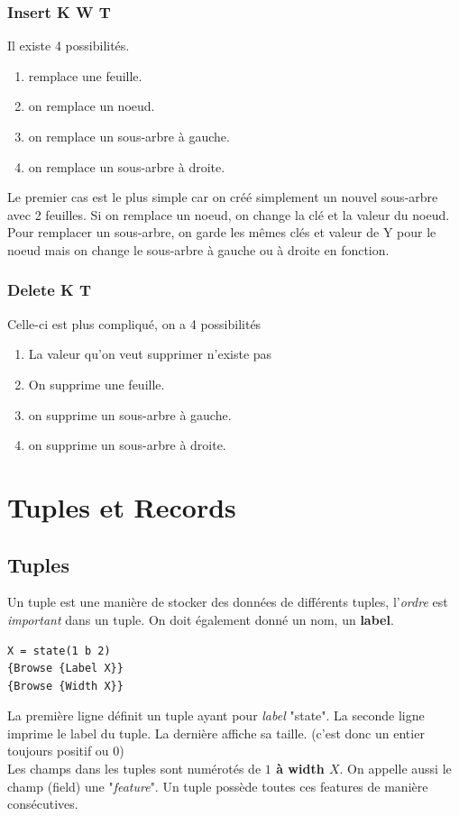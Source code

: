 \documentclass{report}
\begin{document}
\subsubsection{Insert K W T}
Il existe 4 possibilités.
\begin{enumerate}
\item remplace une feuille.
\item on remplace un noeud.
\item on remplace un sous-arbre à gauche.
\item on remplace un sous-arbre à droite.
\end{enumerate}
Le premier cas est le plus simple car on créé simplement un nouvel sous-arbre avec 2 feuilles. Si on remplace un noeud, on change la clé et la valeur du noeud.
Pour remplacer un sous-arbre, on garde les mêmes clés et valeur de Y pour le noeud mais on change le sous-arbre à gauche ou à droite en fonction.
\subsubsection{Delete K T}
Celle-ci est plus compliqué, on a 4 possibilités
\begin{enumerate}
\item La valeur qu'on veut supprimer n'existe pas
\item On supprime une feuille.
\item on supprime un sous-arbre à gauche.
\item on supprime un sous-arbre à droite.
\end{enumerate}

\section{Tuples et Records}

\subsection{Tuples}
Un tuple est une manière de stocker des données de différents tuples, l'\textit{ordre} est \textit{important} dans un tuple. On doit également donné un nom, un \textbf{label}.
\begin{lstlisting}
X = state(1 b 2)
{Browse {Label X}}
{Browse {Width X}}
\end{lstlisting}
La première ligne définit un tuple ayant pour \textit{label} "state". La seconde ligne imprime le label du tuple. La dernière affiche sa taille. (c'est donc un entier toujours positif ou $0$)\\
Les champs dans les tuples sont numérotés de\textbf{ $1$ à width $X$}. On appelle aussi le champ (field) une "\textit{feature}". Un tuple possède toutes ces features de manière consécutives.\\
\end{document}
